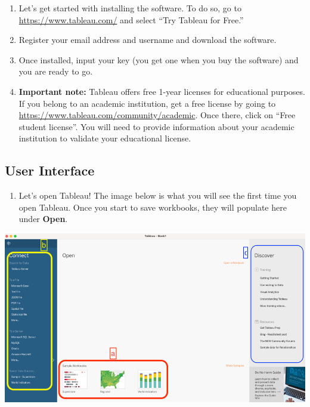 \documentclass[
]{book}
\providecommand{\tightlist}{%
  \setlength{\itemsep}{0pt}\setlength{\parskip}{0pt}}
\begin{document}
\begin{enumerate}
\def\labelenumi{\arabic{enumi}.}
\item
  Let's get started with installing the software. To do so, go to
  \url{https://www.tableau.com/} and select ``Try Tableau for Free.''
\item
  Register your email address and username and download the software.
\item
  Once installed, input your key (you get one when you buy the software) and you are ready to go.
\item
  \textbf{Important note:} Tableau offers free 1-year licenses for educational purposes. If you belong to an academic institution, get a free license by going to \url{https://www.tableau.com/community/academic}. Once there, click on ``Free student license''. You will need to provide information about your academic institution to validate your educational license.
\end{enumerate}

\hypertarget{user-interface}{%
\subsection{User Interface}\label{user-interface}}

\begin{enumerate}
\def\labelenumi{\arabic{enumi}.}
\tightlist
\item
  Let's open Tableau! The image below is what you will see the first time you open Tableau. Once you start to save workbooks, they will populate here under \textbf{Open}.
\end{enumerate}

\includegraphics{images/M3S1_image0_User_Interface.png}
\end{document}
